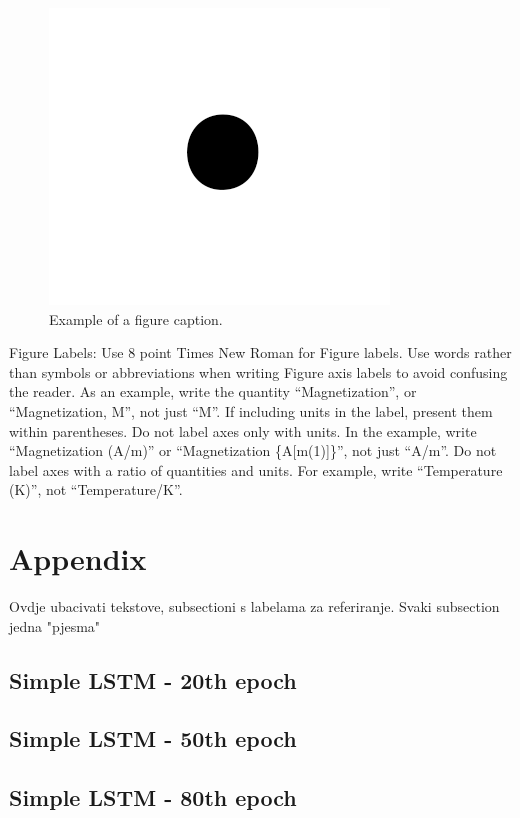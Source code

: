 \documentclass[conference]{IEEEtran}
\begin{document}
\begin{figure}[htbp]
\centerline{\includegraphics{fig1.png}}
\caption{Example of a figure caption.}
\label{fig}
\end{figure}

Figure Labels: Use 8 point Times New Roman for Figure labels. Use words 
rather than symbols or abbreviations when writing Figure axis labels to 
avoid confusing the reader. As an example, write the quantity 
``Magnetization'', or ``Magnetization, M'', not just ``M''. If including 
units in the label, present them within parentheses. Do not label axes only 
with units. In the example, write ``Magnetization (A/m)'' or ``Magnetization 
\{A[m(1)]\}'', not just ``A/m''. Do not label axes with a ratio of 
quantities and units. For example, write ``Temperature (K)'', not 
``Temperature/K''.


\section{Appendix}\label{APDX}

Ovdje ubacivati tekstove, subsectioni s labelama za referiranje.
Svaki subsection jedna "pjesma"

\subsection{Simple LSTM - 20th epoch}\label{LSTM20}
\subsection{Simple LSTM - 50th epoch}\label{LSTM50}
\subsection{Simple LSTM - 80th epoch}\label{LSTM80}
\end{document}
